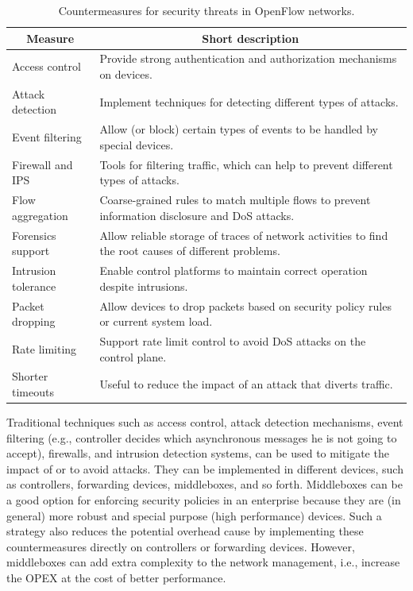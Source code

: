 {\renewcommand{\arraystretch}{1.4}
\begin{table}[!htp]
\caption{Countermeasures for security threats in OpenFlow networks.}
\label{tab:countermeasuresthreats}
\begin{center}
\footnotesize
\begin{tabularx}{\columnwidth}{lX}
\hline
\multicolumn{1}{c}{\textbf{Measure}} & \multicolumn{1}{c}{\textbf{Short description}} \\\hline
Access control       & Provide strong authentication and authorization mechanisms on devices.  \\\hline
Attack detection     & Implement techniques for detecting different types of attacks. \\\hline
Event filtering         & Allow (or block) certain types of events to be handled by special devices. \\\hline
Firewall and IPS     & Tools for filtering traffic, which can help to prevent different types of attacks. \\\hline
Flow aggregation   & Coarse-grained rules to match multiple flows to prevent information disclosure and DoS attacks. \\\hline
Forensics support  & Allow reliable storage of traces of network activities to find the root causes of different problems.  \\\hline
Intrusion tolerance &  Enable control platforms to maintain correct operation despite intrusions. \\\hline
Packet dropping     & Allow devices to drop packets based on security policy rules or current system load. \\\hline
Rate limiting           & Support rate limit control to avoid DoS attacks on the control plane. \\\hline
Shorter timeouts  & Useful to reduce the impact of an attack that diverts traffic.  \\\hline
\end{tabularx}
\end{center}
\end{table}
}

Traditional techniques such as 
access control, attack detection mechanisms, event filtering (e.g.,  controller decides which asynchronous messages he is not going to accept), firewalls, and intrusion detection systems, can be used to mitigate the impact of or to avoid attacks.
They can be implemented in different devices, such as controllers, forwarding devices, middleboxes, and so forth.
Middleboxes can be a good option for enforcing security policies in an enterprise because they are (in general) more robust and special purpose (high performance) devices.
Such a strategy also reduces the potential overhead cause by implementing these countermeasures directly on controllers or forwarding devices.
However, middleboxes can add extra complexity to the network management, i.e., increase the OPEX at the cost of better performance.

